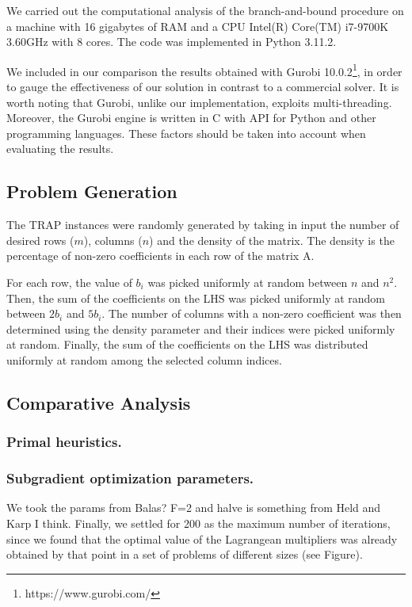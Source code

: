 \documentclass[runningheads]{llncs}
\begin{document}
We carried out the computational analysis of the branch-and-bound procedure on a machine with 16 gigabytes of RAM and a CPU Intel(R) Core(TM) i7-9700K 3.60GHz with 8 cores. The code was implemented in Python 3.11.2.

We included in our comparison the results obtained with Gurobi 10.0.2\footnote{https://www.gurobi.com/}, in order to gauge the effectiveness of our solution in contrast to a commercial solver. It is worth noting that Gurobi, unlike our implementation, exploits multi-threading. Moreover, the Gurobi engine is written in C with API for Python and other programming languages. These factors should be taken into account when evaluating the results.    

\subsection{Problem Generation}
\label{subsec:results:generation}

The TRAP instances were randomly generated by taking in input the number of desired rows ($m$), columns ($n$) and the density of the matrix. The density is the percentage of non-zero coefficients in each row of the matrix A.

For each row, the value of $b_i$ was picked uniformly at random between $n$ and $n^2$. Then, the sum of the coefficients on the LHS was picked uniformly at random between $2b_i$ and $5b_i$. The number of columns with a non-zero coefficient was then determined using the density parameter and their indices were picked uniformly at random. Finally, the sum of the coefficients on the LHS was distributed uniformly at random among the selected column indices.

\subsection{Comparative Analysis}
\label{subsec:results:comparisons}

\subsubsection{Primal heuristics.}

\subsubsection{Subgradient optimization parameters.} We took the params from Balas? F=2 and halve is something from Held and Karp I think. Finally, we settled for 200 as the maximum number of iterations, since we found that the optimal value of the Lagrangean multipliers was already obtained by that point in a set of problems of different sizes (see Figure). 
\end{document}
